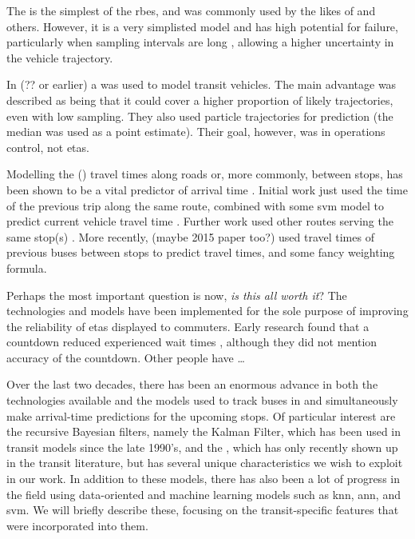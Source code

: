 The \kf{} is the simplest of the \glspl{rbe},
and was commonly used by the likes of \cite{Wall_1999,Cathey_2003} and others.
However, it is a very simplisted model and has high potential for failure,
particularly when sampling intervals are long \citep{cn},
allowing a higher uncertainty in the vehicle trajectory.


In \cite{Hans_2015} (?? or earlier) a \pf{} was used to model transit vehicles.
The main advantage was described as being that it could cover a higher proportion
of likely trajectories, even with low sampling.
They also used particle trajectories for prediction (the median was used as a point estimate).
Their goal, however, was in operations control, not \glspl{eta}.


Modelling the (\rt{}) travel times along roads or, more commonly, between stops,
has been shown to be a vital predictor of arrival time
\citep{cn}.
Initial work just used the time of the previous trip along the same route,
combined with some \gls{svm} model to predict current vehicle travel time \cite{Yu_2006}.
Further work used other routes serving the same stop(s) \cite{Yu_2011}.
More recently, \cite{Cats_2016} (maybe 2015 paper too?) used travel times of previous buses
between stops to predict travel times,
and some fancy weighting formula.



Perhaps the most important question is now, \emph{is this all worth it}?
The technologies and models have been implemented for the sole purpose of
improving the reliability of \glspl{eta} displayed to commuters.
Early research found that a countdown reduced experienced wait times
\citep{TCRP_2003,TCRP_2003b},
although they did not mention accuracy of the countdown.
Other people have \ldots






\pagebreak

Over the last two decades,
there has been an enormous advance in both the technologies available and the models used
to track buses in \rt{} and simultaneously make arrival-time predictions for the upcoming stops.
Of particular interest are the recursive Bayesian filters,
namely the Kalman Filter, which has been used in transit models since the late 1990's,
and the \pf{}, which has only recently shown up in the transit literature,
but has several unique characteristics we wish to exploit in our work.
In addition to these models,
there has also been a lot of progress in the field using data-oriented and machine learning models
such as \gls{knn}, \gls{ann}, and \gls{svm}.
We will briefly describe these,
focusing on the transit-specific features that were incorporated into them.


